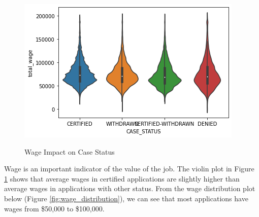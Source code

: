 \documentclass{article}
\begin{document}
\begin{figure}[h]
\begin{minipage}{.33\textwidth}
        \centering
        \caption{Wage Impact on Case Status}
        \includegraphics[width = \textwidth]{figures/wage_violin.png}
        \label{fig:violin}
    \end{minipage}
\end{figure}

Wage is an important indicator of the value of the job. The violin plot in Figure \ref{fig:violin} shows that average wages in certified applications are slightly higher than average wages in applications with other status. From the wage distribution plot below (Figure \ref{fig:wage_distribution}), we can see that most applications have wages from \$50,000 to \$100,000.
\end{document}
